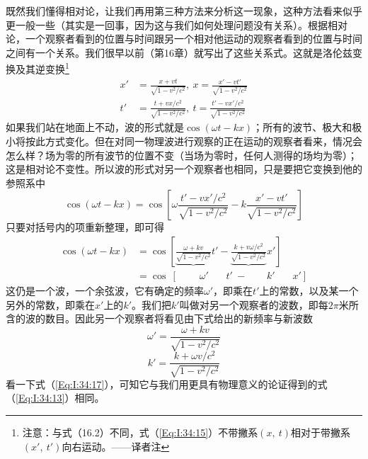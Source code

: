 既然我们懂得相对论，让我们再用第三种方法来分析这一现象，这种方法看来似乎更一般一些（其实是一回事，因为这与我们如何处理问题没有关系）。根据相对论，一个观察者看到的位置与时间跟另一个相对他运动的观察者看到的位置与时间之间有一个关系。我们很早以前（第16章）就写出了这些关系式。这就是洛伦兹变换及其逆变换\footnote{注意：与式（16.2）不同，式（\ref{Eq:I:34:15}）不带撇系$(x,~t)$相对于带撇系$(x',~t')$向右运动。——译者注}
\begin{equation}
    \label{Eq:I:34:15}
    \begin{aligned}
        x' &= \frac{x+vt}{\sqrt{1-v^2/c^2}},~x = \frac{x'-vt'}{\sqrt{1-v^2/c^2}} \\
        t' &= \frac{t+vx/c^2}{\sqrt{1-v^2/c^2}},~t = \frac{t'-vx'/c^2}{\sqrt{1-v^2/c^2}} 
    \end{aligned}
\end{equation}
如果我们站在地面上不动，波的形式就是$\cos(\omega t-kx)$；所有的波节、极大和极小将按此方式变化。但在对同一物理波进行观察的正在运动的观察者看来，情况会怎么样？场为零的所有波节的位置不变（当场为零时，任何人测得的场均为零）；这是相对论不变性。所以波的形式对另一个观察者也相同，只是要把它变换到他的参照系中
\begin{equation*}
    \cos(\omega t - kx) = \cos \left [ \omega\frac{t'-vx'/c^2}{\sqrt{1-v^2/c^2}} - k\frac{x'-vt'}{\sqrt{1-v^2/c^2}} \right ]
\end{equation*}
只要对括号内的项重新整理，即可得
\begin{equation}
    \label{Eq:I:34:16}
    \begin{aligned}
        \cos(\omega t - kx) &= \cos \left [ \underbrace{\frac{\omega + kv}{\sqrt{1-v^2/c^2}}}t' - \underbrace{\frac{k + v\omega /c^2}{\sqrt{1-v^2/c^2}}}x' \right ] \\
        &=\cos~[~~~~~~~~~~\omega'~~~~~~~~ t' ~-~~~~~~~~~ k' ~~~~~~~~x']
    \end{aligned}
\end{equation}
这仍是一个波，一个余弦波，它有确定的频率$\omega'$，即乘在$t'$上的常数，以及某一个另外的常数，即乘在$x'$上的$k'$。我们把$k'$叫做对另一个观察者的波数，即每$2\pi$米所含的波的数目。因此另一个观察者将看见由下式给出的新频率与新波数
\begin{equation}
    \label{Eq:I:34:17}
    \omega' = \frac{\omega + kv}{\sqrt{1-v^2/c^2}}
\end{equation}
\begin{equation}
    \label{Eq:I:34:18}
    k' = \frac{k + \omega v/c^2}{\sqrt{1-v^2/c^2}}
\end{equation}
看一下式（\ref{Eq:I:34:17}），可知它与我们用更具有物理意义的论证得到的式（\ref{Eq:I:34:13}）相同。

